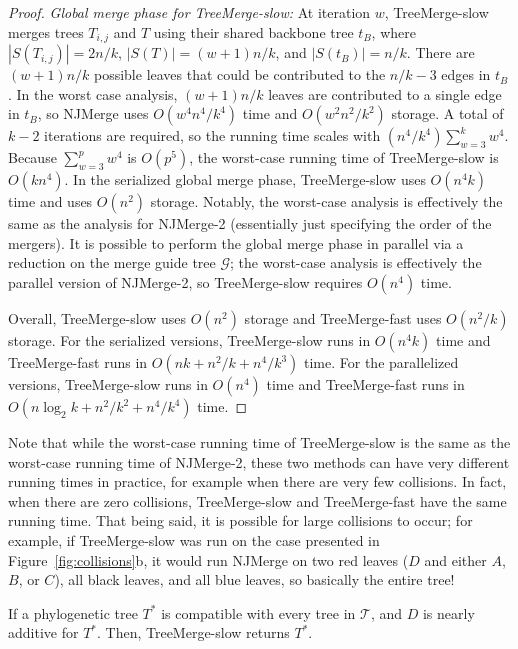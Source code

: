 \begin{proof}
\emph{Global merge phase for TreeMerge-slow:}
At iteration $w$, TreeMerge-slow merges trees $T_{i,j}$ and $T$ using their shared backbone tree $t_B$, where $|S(T_{i,j})| = 2n/k$, $|S(T)| = (w + 1)n/k$, and $|S(t_B)| = n/k$.
There are $(w+1)n/k$ possible leaves that could be contributed to the $n/k - 3$ edges in $t_B$.
In the worst case analysis, $(w+1) n / k$ leaves are contributed to a single edge in $t_B$, so NJMerge uses $O(w^4 n^4 / k^4)$ time and $O(w^2 n^2 / k^2)$ storage.
A total of $k-2$ iterations are required, so the running time scales with $(n^4/k^4) \sum_{w=3}^k w^4$.
Because $\sum_{w=3}^p w^4$ is $O(p^5)$, the worst-case running time of TreeMerge-slow is $O(kn^4)$.
In the serialized global merge phase, TreeMerge-slow uses $O(n^4k)$ time and uses $O(n^2)$ storage.
Notably, the worst-case analysis is effectively the same as the analysis for NJMerge-2 (essentially just specifying the order of the mergers).
It is possible to perform the global merge phase in parallel via a reduction on the merge guide tree $\mathcal{G}$; the worst-case analysis is effectively the parallel version of NJMerge-2, so TreeMerge-slow requires $O(n^4)$ time.

Overall, TreeMerge-slow uses $O(n^2)$ storage and TreeMerge-fast uses $O(n^2/k)$ storage.
For the serialized versions, TreeMerge-slow runs in $O(n^4k)$ time and TreeMerge-fast runs in $O(nk + n^2/k + n^4/k^3)$ time.
For the parallelized versions, TreeMerge-slow runs in $O(n^4)$ time and TreeMerge-fast runs in $O(n \log_2{k} + n^2/k^2 + n^4/k^4)$ time.
\end{proof}

Note that while the worst-case running time of TreeMerge-slow is the same as the worst-case running time of NJMerge-2, these two methods can have very different running times in practice, for example when there are very few collisions. 
In fact, when there are zero collisions, TreeMerge-slow and TreeMerge-fast have the same running time.
That being said, it is possible for large collisions to occur; for example, if TreeMerge-slow was run on the case presented in Figure~\ref{fig:collisions}b, it would run NJMerge on two red leaves ($D$ and either $A$, $B$, or $C$), all black leaves, and all blue leaves, so basically the entire tree!

\begin{theorem}
\label{thm:treemerge-slow-correct}
If a phylogenetic tree $T^*$ is compatible with every tree in $\mathcal{T}$, and $D$ is nearly additive for $T^*$.
Then, TreeMerge-slow returns $T^*$.
\end{theorem}

